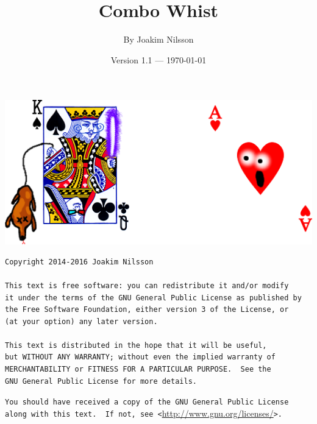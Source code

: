 \documentclass[a4paper]{article}
\title{Combo Whist}
\author{By Joakim Nilsson}
\date{Version 1.1 --- \today}
\begin{document}
	\maketitle

	\vfill

	\begin{center}
		\includegraphics[width = \textwidth]{logo.png}
	\end{center}

	\vfill

\begin{verbatim}
Copyright 2014-2016 Joakim Nilsson

This text is free software: you can redistribute it and/or modify
it under the terms of the GNU General Public License as published by
the Free Software Foundation, either version 3 of the License, or
(at your option) any later version.

This text is distributed in the hope that it will be useful,
but WITHOUT ANY WARRANTY; without even the implied warranty of
MERCHANTABILITY or FITNESS FOR A PARTICULAR PURPOSE.  See the
GNU General Public License for more details.
\end{verbatim}
	\verb|You should have received a copy of the GNU General Public License|\\
	\verb|along with this text.  If not, see <|\url{http://www.gnu.org/licenses/}\verb|>.|

	\thispagestyle{empty}
	\pagebreak

	\setcounter{tocdepth}{3}
	\tableofcontents
	\listoftables
	\thispagestyle{empty}
	\pagebreak
\end{document}
